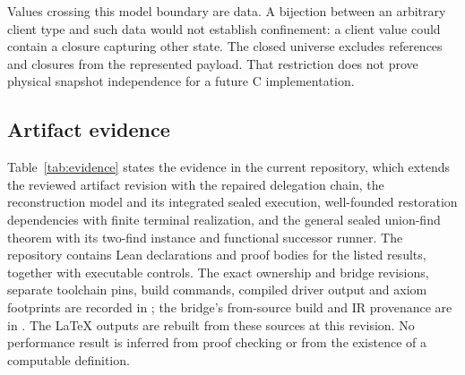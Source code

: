 \documentclass[a4paper,UKenglish,cleveref]{lipics-v2021}
\begin{document}
Values crossing this model boundary are  data. A bijection between
an arbitrary client type and such data would not establish confinement: a
client value could contain a closure capturing other state. The closed universe
excludes references and closures from the represented payload. That restriction
does not prove physical snapshot independence for a future C implementation.

\subsection{Artifact evidence}

Table~\ref{tab:evidence} states the evidence in the current repository, which
extends the reviewed artifact revision  with the repaired
delegation chain, the reconstruction model and its integrated sealed execution,
well-founded restoration dependencies with finite terminal realization, and the
general sealed union-find theorem with its two-find instance and functional
successor runner. The repository contains Lean declarations and proof bodies
for the listed results, together with executable controls. The exact ownership
and bridge revisions, separate toolchain pins, build commands, compiled driver
output and axiom footprints are recorded in
; the bridge's from-source build and IR
provenance are in . The LaTeX outputs are rebuilt
from these sources at this revision. No performance
result is inferred from proof checking or from the existence of a computable
definition.
\end{document}
